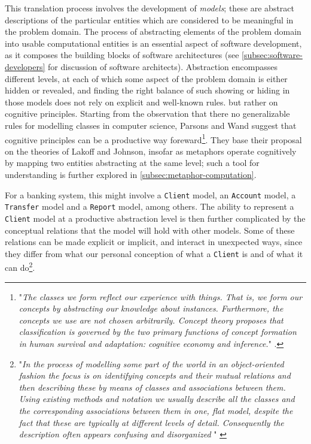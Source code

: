 This translation process involves the development of \emph{models}; these are abstract descriptions of the particular entities which are considered to be meaningful in the problem domain. The process of abstracting elements of the problem domain into usable computational entities is an essential aspect of software development, as it composes the building blocks of software architectures (see \autoref{subsec:software-developers} for discussion of software architects). Abstraction encompasses different levels, at each of which some aspect of the problem domain is either hidden or revealed, and finding the right balance of such showing or hiding in those models does not rely on explicit and well-known rules. but rather on cognitive principles. Starting from the observation that there no generalizable rules for modelling classes in computer science, Parsons and Wand suggest that cognitive principles can be a productive way foreward\footnote{"\emph{The classes we form reflect our experience with things. That is, we form our concepts by abstracting our knowledge about instances. Furthermore, the concepts we use are not chosen arbitrarily. Concept theory proposes that classification is governed by the two primary functions of concept formation in human survival and adaptation: cognitive economy and inference.}" \citep{parsons_choosing_1997}.}. They base their proposal on the theories of Lakoff and Johnson, insofar as metaphors operate cognitively by mapping two entities abstracting at the same level; such a tool for understanding is further explored in \autoref{subsec:metaphor-computation}.

For a banking system, this might involve a \lstinline{Client} model, an \lstinline{Account} model, a \lstinline{Transfer} model and a \lstinline{Report} model, among others. The ability to represent a \lstinline{Client} model at a productive abstraction level is then further complicated by the conceptual relations that the model will hold with other models. Some of these relations can be made explicit or implicit, and interact in unexpected ways, since they differ from what our personal conception of what a \lstinline{Client} is and of what it can do\footnote{"\emph{In the process of modelling some part of the world in an object-oriented fashion the focus is on identifying concepts and their mutual relations and then describing these by means of classes and associations between them. Using existing methods and notation we usually describe all the classes and the corresponding associations between them in one, flat model, despite the fact that these are typically at different levels of detail. Consequently the description often appears confusing and disorganized} " \citep{kristensen_complex_1994}}.


